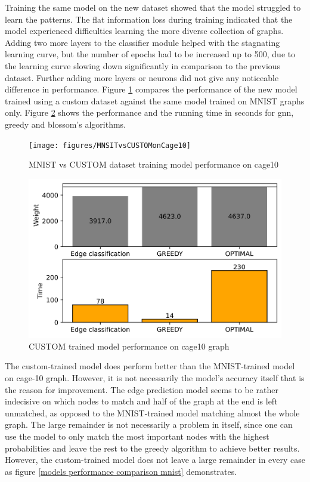 Training the same model on the new dataset showed that the model struggled to learn the patterns. The flat information loss during training indicated that the model experienced difficulties learning the more diverse collection of graphs. Adding two more layers to the classifier module helped with the stagnating learning curve, but the number of epochs had to be increased up to 500, due to the learning curve slowing down significantly in comparison to the previous dataset. Further adding more layers or neurons did not give any noticeable difference in performance. Figure \ref{models performance comparison cage10} compares the performance of the new model trained using a custom dataset against the same model trained on MNIST graphs only. Figure \ref{custom data model performance cage10} shows the performance and the running time in seconds for \gls{gnn}, greedy and blossom's algorithms.

\begin{figure}[H]
    \centering
    \hspace*{-2cm}
    \texttt{[image: figures/MNSITvsCUSTOMonCage10]}
    \caption{MNIST vs CUSTOM dataset training model performance on cage10}
    \label{models performance comparison cage10}
\end{figure}

\begin{figure}[H]
    \centering
    \includegraphics[scale=1.0]{figures/CUSTOMtrainCAGE10}
    \caption{CUSTOM trained model performance on cage10 graph}
    \label{custom data model performance cage10}
\end{figure}

The custom-trained model does perform better than the MNIST-trained model on cage-10 graph. However, it is not necessarily the model's accuracy itself that is the reason for improvement. The edge prediction model seems to be rather indecisive on which nodes to match and half of the graph at the end is left unmatched, as opposed to the MNIST-trained model matching almost the whole graph. The large remainder is not necessarily a problem in itself, since one can use the model to only match the most important nodes with the highest probabilities and leave the rest to the greedy algorithm to achieve better results. However, the custom-trained model does not leave a large remainder in every case as figure \ref{models performance comparison mnist} demonstrates. 

